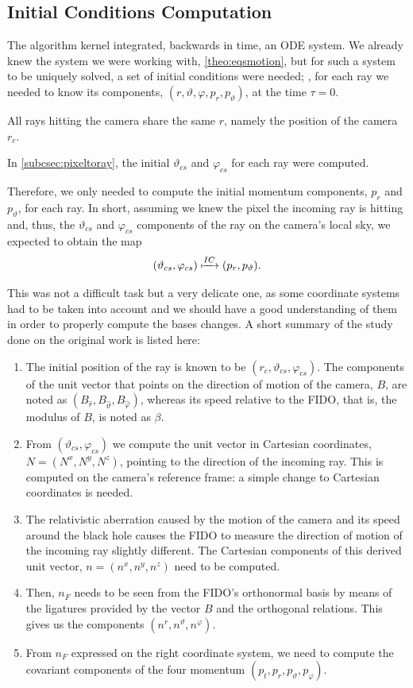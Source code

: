 \subsection{Initial Conditions Computation}
\label{sec:initcond}

The algorithm kernel integrated, backwards in time, an \ac{ODE} system. We already knew the system we were working with, \autoref{theo:eqsmotion}, but for such a system to be uniquely solved, a set of initial conditions were needed; \ie, for each ray we needed to know its components, $(r, \vartheta, \varphi, p_r, p_\vartheta)$, at the time $\tau = 0$.

All rays hitting the camera share the same $r$, namely the position of the camera $r_c$.

In \autoref{subcsec:pixeltoray}, the initial $\vartheta_{cs}$ and $\varphi_{cs}$ for each ray were computed.

Therefore, we only needed to compute the initial momentum components, $p_r$ and $p_\vartheta$, for each ray. In short, assuming we knew the pixel the incoming ray is hitting and, thus, the $\vartheta_{cs}$ and $\varphi_{cs}$ components of the ray on the camera's local sky, we expected to obtain the map
\[
(\vartheta_{cs}, \varphi_{cs}) \xmapsto{IC} (p_r, p_\vartheta).
\]

This was not a difficult task but a very delicate one, as some coordinate systems had to be taken into account and we should have a good understanding of them in order to properly compute the bases changes. A short summary of the study done on the original work is listed here:
\begin{enumerate}
	\item The initial position of the ray is known to be $(r_c, \vartheta_{cs}, \varphi_{cs})$. The components of the unit vector that points on the direction of motion of the camera, $B$, are noted as $(B_{\widehat{r}}, B_{\widehat{\vartheta}}, B_{\widehat{\varphi}})$, whereas its speed relative to the \ac{FIDO}, that is, the modulus of $B$, is noted as $\beta$.
	\item From $(\vartheta_{cs}, \varphi_{cs})$ we compute the unit vector in Cartesian coordinates, $N = (N^x, N^y, N^z)$, pointing to the direction of the incoming ray. This is computed on the camera's reference frame: a simple change to Cartesian coordinates is needed.
	\item The relativistic aberration caused by the motion of the camera and its speed around the black hole causes the \ac{FIDO} to measure the direction of motion of the incoming ray slightly different. The Cartesian components of this derived unit vector, $n = (n^x, n^y, n^z)$ need to be computed.
	\item Then, $n_F$ needs to be seen from the \ac{FIDO}'s orthonormal basis by means of the ligatures provided by the vector $B$ and the orthogonal relations. This gives us the components $(n^r, n^\vartheta, n^\varphi)$.
	\item From $n_F$ expressed on the right coordinate system, we need to compute the covariant components of the four momentum $(p_t, p_r, p_\vartheta, p_\varphi)$.
\end{enumerate}


